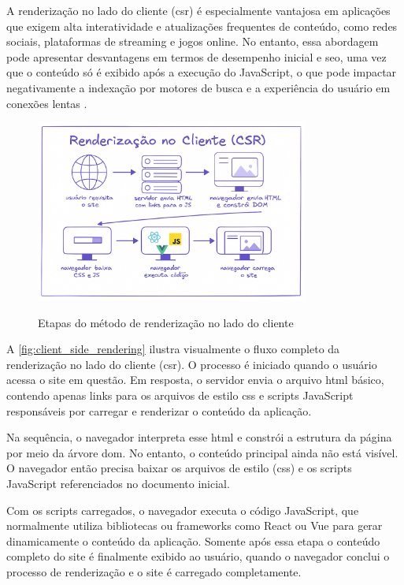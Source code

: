 A renderização no lado do cliente (\acrshort{csr}) é especialmente vantajosa em aplicações que exigem alta interatividade e atualizações frequentes de conteúdo, como redes sociais, plataformas de streaming e jogos online. No entanto, essa abordagem pode apresentar desvantagens em termos de desempenho inicial e \acrshort{seo}, uma vez que o conteúdo só é exibido após a execução do JavaScript, o que pode impactar negativamente a indexação por motores de busca e a experiência do usuário em conexões lentas \cite{atori2024}.

\begin{figure}[h!]
    \centering
    \caption{Etapas do método de renderização no lado do cliente}
    \includegraphics[width=0.8\textwidth]{media/client_side_rendering.png}
    \label{fig:client_side_rendering}
\end{figure}


A \autoref{fig:client_side_rendering} ilustra visualmente o fluxo completo da renderização no lado do cliente (\acrshort{csr}). O processo é iniciado quando o usuário acessa o site em questão. Em resposta, o servidor envia o arquivo \acrshort{html} básico, contendo apenas links para os arquivos de estilo \acrshort{css} e scripts JavaScript responsáveis por carregar e renderizar o conteúdo da aplicação.

Na sequência, o navegador interpreta esse \acrshort{html} e constrói a estrutura da página por meio da árvore \acrshort{dom}. No entanto, o conteúdo principal ainda não está visível. O navegador então precisa baixar os arquivos de estilo (\acrshort{css}) e os scripts JavaScript referenciados no documento inicial.

Com os scripts carregados, o navegador executa o código JavaScript, que normalmente utiliza bibliotecas ou frameworks como React ou Vue para gerar dinamicamente o conteúdo da aplicação. Somente após essa etapa o conteúdo completo do site é finalmente exibido ao usuário, quando o navegador conclui o processo de renderização e o site é carregado completamente.

